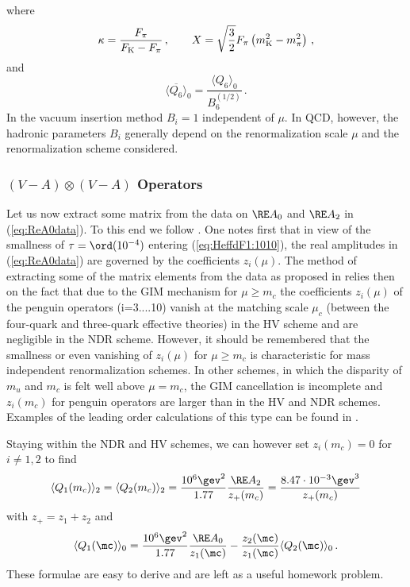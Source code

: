 where
\begin{equation}
\kappa = 
         \frac{F_\pi}{F_{\rm K} - F_\pi} \, ,
\qquad
X = \sqrt{\frac{3}{2}} F_\pi \left( m_{\rm K}^2 - m_\pi^2 \right) \, ,
\label{eq:XQi}
\end{equation}
and
\begin{equation}
\langle \overline{Q_6} \rangle_0 =
   \frac{\langle Q_6 \rangle_0}{B_6^{(1/2)}} \, .
\label{eq:Q60bar}
\end{equation}
In the vacuum insertion method $B_i=1$ independent of $\mu$. In QCD,
however, the hadronic parameters $B_i$ generally depend on the
renormalization scale $\mu$ and the renormalization scheme considered.
\subsubsection{$(V-A) \otimes (V-A)$ Operators}
Let us now extract some matrix from the data on $\RE A_0$ and $\RE A_2$
in (\ref{eq:ReA0data}). To this end we follow \cite{BJLW}.
One notes first that in view of the smallness of 
$\tau=\ord(10^{-4})$ entering
(\ref{eq:HeffdF1:1010}), the
real amplitudes in (\ref{eq:ReA0data}) are governed by the coefficients
$z_i(\mu)$. The method of extracting some of the matrix elements
from the data as proposed in \cite{BJLW} relies then on the
fact that due to the GIM mechanism for $ \mu\ge m_c$ 
the coefficients $z_i(\mu)$ of
the penguin operators (i=3....10) vanish at the matching scale $\mu_c$
(between the four-quark and three-quark effective theories) in the HV
scheme and are negligible in the NDR scheme. 
However, it should be remembered that the smallness or even vanishing
of $z_i(\mu)$ for $ \mu\ge m_c$ is characteristic for mass independent
renormalization schemes. In other schemes, in which the disparity of
$m_u$ and $m_c$ is felt well above $\mu=m_c$, the GIM cancellation is
incomplete and $z_i(m_c)$ for penguin operators are larger than in the
HV and NDR schemes. Examples of the leading order calculations
of this type can be found in \cite{ANII}.   

Staying within the NDR and HV schemes, we can however set $z_i(m_c)=0$
for $i\not=1,2$ 
to find
\begin{equation}
\langle Q_1(m_c) \rangle_2 = \langle Q_2(m_c) \rangle_2 =
\frac{10^6\gev^2}{1.77} \frac{\RE A_2}{z_+(m_c)} =
\frac{8.47 \cdot 10^{-3}\gev^3}{z_+(m_c)}
\label{eq:Q122data}
\end{equation}
with $z_+=z_1+z_2$ and
\begin{equation}
\langle Q_1(\mc) \rangle_0 = \frac{10^6\gev^2}{1.77} \frac{\RE
A_0}{z_1(\mc)} - \frac{z_2(\mc)}{z_1(\mc)} \langle Q_2(\mc) \rangle_0\,.
\label{eq:Q10mc}
\end{equation}
These formulae are easy to derive and are left as a useful homework
problem.

